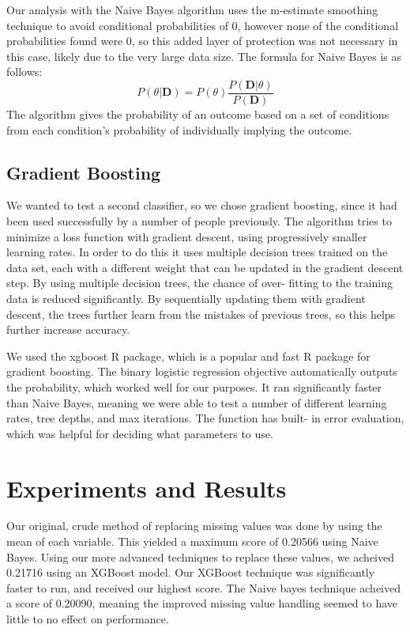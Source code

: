 \documentclass[fleqn,10pt]{SelfArx} %
\begin{document}
Our analysis with the Naive Bayes algorithm uses the m-estimate smoothing technique to avoid conditional probabilities of 0, however none of the conditional probabilities found were 0, so this added layer of protection was not necessary in this case, likely due to the very large data size. The formula for Naive Bayes is as follows:
\begin{equation}
\label{eq:bayes}
P(\theta|\textbf{D}) = P(\theta ) \frac{P(\textbf{D} |\theta)}{P(\textbf{D})}
\end{equation}
The algorithm gives the probability of an outcome based on a set of conditions from each condition’s probability of individually implying the outcome.


\subsection{Gradient Boosting}
We wanted to test a second classifier, so we chose gradient boosting, since it had been used successfully by a number of people previously. The algorithm tries to minimize a loss function with gradient descent, using progressively smaller learning rates. In order to do this it uses multiple decision trees trained on the data set, each with a different weight that can be updated in the gradient descent step. By using multiple decision trees, the chance of over- fitting to the training data is reduced significantly. By sequentially updating them with gradient descent, the trees further learn from the mistakes of previous trees, so this helps further increase accuracy. 

We used the xgboost R package, which is a popular and fast R package for gradient boosting. The binary logistic regression objective automatically outputs the probability, which worked well for our purposes. It ran significantly faster than Naive Bayes, meaning we were able to test a number of different learning rates, tree depths, and max iterations. The function has built- in error evaluation, which was helpful for deciding what parameters to use. 


\bigskip
\bigskip
\section{Experiments and Results}
Our original, crude method of replacing missing values was done by using the mean of each variable. This yielded a maximum score of 0.20566 using Naive Bayes. Using our more advanced techniques to replace these values, we acheived 0.21716 using an XGBoost model. Our XGBoost technique was significantly faster to run, and received our highest score. The Naive bayes technique acheived a score of 0.20090, meaning the improved missing value handling seemed to have little to no effect on performance.
\end{document}
